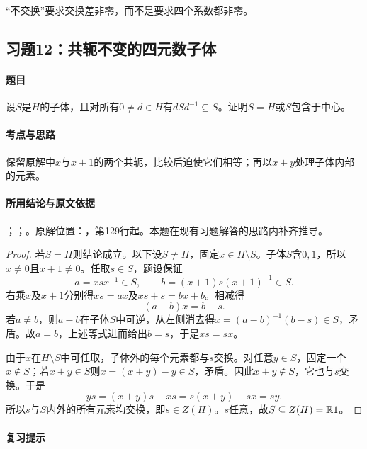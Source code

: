 “不交换”要求交换差非零，而不是要求四个系数都非零。



\subsection{习题12：共轭不变的四元数子体}

\label{ex:3:12}

\paragraph{题目}

设$S$是$H$的子体，且对所有$0\ne d\in H$有$dSd^{-1}\subseteq S$。证明$S=H$或$S$包含于中心。

\paragraph{考点与思路}

保留原解中$x$与$x+1$的两个共轭，比较后迫使它们相等；再以$x+y$处理子体内部的元素。

\paragraph{所用结论与原文依据}

；；。原解位置：，第129行起。本题在现有习题解答的思路内补齐推导。


\begin{proof}

若$S=H$则结论成立。以下设$S\ne H$，固定$x\in H\setminus S$。子体$S$含$0,1$，所以$x\ne0$且$x+1\ne0$。任取$s\in S$，题设保证
\[
a=xsx^{-1}\in S,\qquad b=(x+1)s(x+1)^{-1}\in S.
\]
右乘$x$及$x+1$分别得$xs=ax$及$xs+s=bx+b$。相减得
\[
(a-b)x=b-s.
\]
若$a\ne b$，则$a-b$在子体$S$中可逆，从左侧消去得$x=(a-b)^{-1}(b-s)\in S$，矛盾。故$a=b$，上述等式进而给出$b=s$，于是$xs=sx$。

由于$x$在$H\setminus S$中可任取，子体外的每个元素都与$s$交换。对任意$y\in S$，固定一个$x\notin S$；若$x+y\in S$则$x=(x+y)-y\in S$，矛盾。因此$x+y\notin S$，它也与$s$交换。于是
\[
ys=(x+y)s-xs=s(x+y)-sx=sy.
\]
所以$s$与$S$内外的所有元素均交换，即$s\in Z(H)$。$s$任意，故$S\subseteq Z(H)=\mathbb R1$。

\end{proof}

\paragraph{复习提示}

